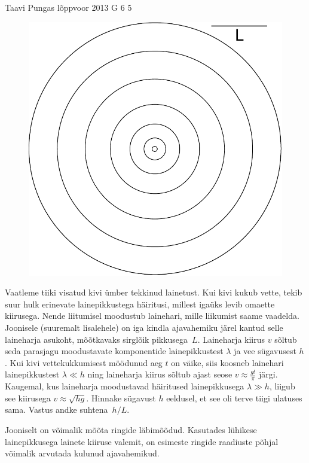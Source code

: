 {Taavi Pungas} %
{lõppvoor} %
{2013} %
{G 6} %
{5} %
{
\ifStatement
\begin{figure}%
\includegraphics[width=\linewidth]{2013-v3g-06-lained}%
\end{figure}
Vaatleme tiiki visatud kivi ümber tekkinud lainetust. Kui kivi kukub vette,
tekib suur hulk erinevate lainepikkustega häiritusi, millest igaüks levib
omaette kiirusega. Nende liitumisel moodustub lainehari, mille liikumist
saame vaadelda. Joonisele (suuremalt lisalehele) on iga kindla ajavahemiku järel kantud selle
laineharja asukoht, mõõtkavaks sirglõik pikkusega~$L$. Laineharja kiirus $v$
sõltub seda parasjagu moodustavate komponentide lainepikkustest $\lambda$ ja vee
sügavusest $h$. Kui kivi vettekukkumisest möödunud aeg $t$ on väike, siis
koosneb lainehari lainepikkustest $\lambda \ll h$ ning laineharja kiirus sõltub
ajast seose $v \approx \frac{gt}{\pi}$ järgi. Kaugemal, kus laineharja
moodustavad häiritused lainepikkusega $\lambda \gg h$, liigub see kiirusega $v
\approx \sqrt{hg}$. Hinnake sügavust $h$ eeldusel, et see oli terve tiigi
ulatuses sama. Vastus andke suhtena~$h/L$.
\fi


\ifHint
Jooniselt on võimalik mõõta ringide läbimõõdud. Kasutades lühikese lainepikkusega lainete kiiruse valemit, on esimeste ringide raadiuste põhjal võimalik arvutada kulunud ajavahemikud.
\fi


}
